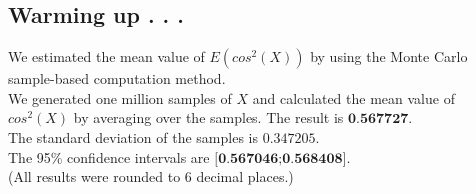 \subsection{Warming up . . .}
We estimated the mean value of $E(cos^2(X))$ by using the Monte Carlo sample-based computation method.\\
We generated one million samples of $X$ and calculated the mean value of $cos^2(X)$ by averaging over the samples.
The result is $\textbf{0.567727}$.\\
The standard deviation of the samples is $0.347205$.\\
The 95\% confidence intervals are
$\textbf{[0.567046;0.568408]}$.\\
(All results were rounded to 6 decimal places.)
